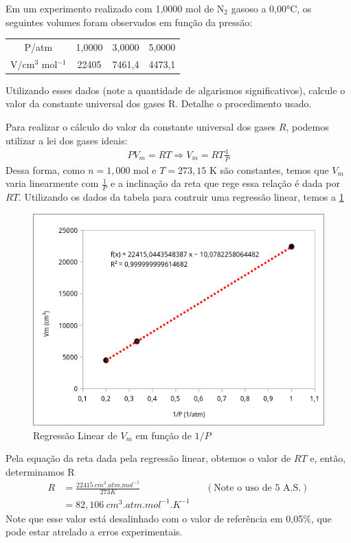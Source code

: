 \begin{xcs}
    Em um experimento realizado com 1,0000 mol de N\(_2\) gasoso a 0,00°C, os
    seguintes volumes foram observados em função da pressão: 
    \begin{center}
    \begin{tabular}{c | c c c}
    \hline
        P/atm & 1,0000 & 3,0000 & 5,0000\\
        V/cm\(^3\) mol\(^{-1}\) & 22405 & 7461,4 & 4473,1\\
    \hline
    \end{tabular}
    \end{center}
    Utilizando esses dados (note a quantidade de algarismos significativos),
    calcule o valor da constante universal dos gases R. Detalhe o procedimento
    usado.
\end{xcs}
\begin{rsl}
    
    Para realizar o cálculo do valor da constante universal dos gases \( R \),
    podemos utilizar a lei dos gases ideais: 
    \begin{align*}
        PV_m = RT \Rightarrow 
        V_m = RT \frac{1}{P} 
    \end{align*}
    Dessa forma, como \( n = 1,000 \) mol e \( T = 273,15 \) K são constantes,
    temos que \( V_m \) varia linearmente com \( \frac{1}{P} \) e a inclinação
    da reta que rege essa relação é dada por \( RT \). Utilizando os dados
    da tabela para contruir uma regressão linear, temos a \cref{reggeo} 
    \begin{figure}[H]
        \centering
        \includegraphics[width=.4\linewidth]{images/geo1.png}
        \caption{Regressão Linear de \(V_m\) em função de \( 1/P \) }
        \label{reggeo}
    \end{figure}
    Pela equação da reta dada pela regressão linear, obtemos o valor de \( RT \)
    e, então, determinamos R
    \begin{align*}
        R &= \frac{22415 \ \unit{cm^3.atm.mol^{-1}} }{273K} && (\text{Note o uso
        de 5 A.S.})\\
        &= 82,106 \ \unit{cm^3.atm.mol^{-1}.K^{-1}}
    \end{align*}
    Note que esse valor está desalinhado com o valor de referência em 0,05\%, que pode estar atrelado a erros experimentais.
    
\end{rsl}
